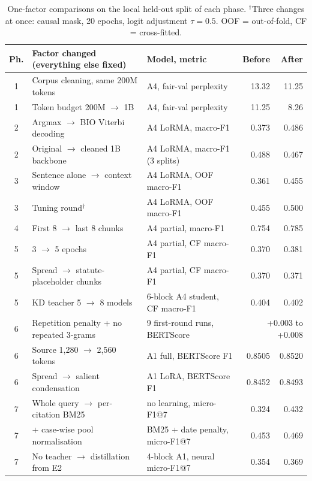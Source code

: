 \documentclass[11pt, oneside]{article}
\begin{document}
\begin{table}[!t]\centering\footnotesize
\caption{One-factor comparisons on the local held-out split of each phase.  $^\dagger$Three changes at once:
causal mask, 20 epochs, logit adjustment $\tau=0.5$.  OOF = out-of-fold, CF = cross-fitted.}\label{tab:ablations}
\scriptsize\begin{tabularx}{\linewidth}{cXlrr}\toprule
Ph. & Factor changed (everything else fixed) & Model, metric & Before & After\\\midrule
1 & Corpus cleaning, same 200M tokens & A4, fair-val perplexity & 13.32 & 11.25\\
1 & Token budget 200M $\rightarrow$ 1B & A4, fair-val perplexity & 11.25 & 8.26\\
2 & Argmax $\rightarrow$ BIO Viterbi decoding & A4 LoRMA, macro-F1 & 0.373 & 0.486\\
2 & Original $\rightarrow$ cleaned 1B backbone & A4 LoRMA, macro-F1 (3 splits) & 0.488 & 0.467\\
3 & Sentence alone $\rightarrow$ context window & A4 LoRMA, OOF macro-F1 & 0.361 & 0.455\\
3 & Tuning round$^\dagger$ & A4 LoRMA, OOF macro-F1 & 0.455 & 0.500\\
4 & First 8 $\rightarrow$ last 8 chunks & A4 partial, macro-F1 & 0.754 & 0.785\\
5 & 3 $\rightarrow$ 5 epochs & A4 partial, CF macro-F1 & 0.370 & 0.381\\
5 & Spread $\rightarrow$ statute-placeholder chunks & A4 partial, CF macro-F1 & 0.370 & 0.371\\
5 & KD teacher 5 $\rightarrow$ 8 models & 6-block A4 student, CF macro-F1 & 0.404 & 0.402\\
6 & Repetition penalty + no repeated 3-grams & 9 first-round runs, BERTScore & \multicolumn{2}{r}{+0.003 to +0.008}\\
6 & Source 1,280 $\rightarrow$ 2,560 tokens & A1 full, BERTScore F1 & 0.8505 & 0.8520\\
6 & Spread $\rightarrow$ salient condensation & A1 LoRA, BERTScore F1 & 0.8452 & 0.8493\\
7 & Whole query $\rightarrow$ per-citation BM25 & no learning, micro-F1@7 & 0.324 & 0.432\\
7 & + case-wise pool normalisation & BM25 + date penalty, micro-F1@7 & 0.453 & 0.469\\
7 & No teacher $\rightarrow$ distillation from E2 & 4-block A1, neural micro-F1@7 & 0.354 & 0.369\\
\bottomrule\end{tabularx}\end{table}
\end{document}
